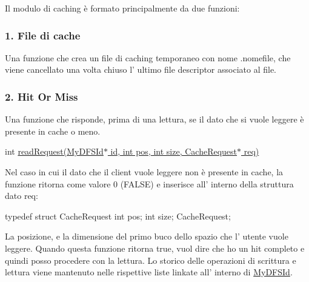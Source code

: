 Il modulo di caching è formato principalmente da due funzioni\+:

\subsubsection*{1. File di cache}

Una funzione che crea un file di caching temporaneo con nome .nomefile, che viene cancellato una volta chiuso l' ultimo file descriptor associato al file.

\subsubsection*{2. Hit Or Miss}

Una funzione che risponde, prima di una lettura, se il dato che si vuole leggere è presente in cache o meno.

int \hyperlink{Cache_8h_a403785c0f2573dd16d81eff4ab26c20d}{read\+Request(\+My\+D\+F\+S\+Id$\ast$ id, int pos, int size, Cache\+Request$\ast$ req)}

Nel caso in cui il dato che il client vuole leggere non è presente in cache, la funzione ritorna come valore 0 (F\+A\+L\+S\+E) e inserisce all' interno della struttura dato req\+: \begin{DoxyVerb}typedef struct CacheRequest {
    int pos;
    int size;
}CacheRequest;
\end{DoxyVerb}
 La posizione, e la dimensione del primo buco dello spazio che l' utente vuole leggere. Quando questa funzione ritorna true, vuol dire che ho un hit completo e quindi posso procedere con la lettura. Lo storico delle operazioni di scrittura e lettura viene mantenuto nelle rispettive liste linkate all' interno di \hyperlink{structMyDFSId}{My\+D\+F\+S\+Id}. 